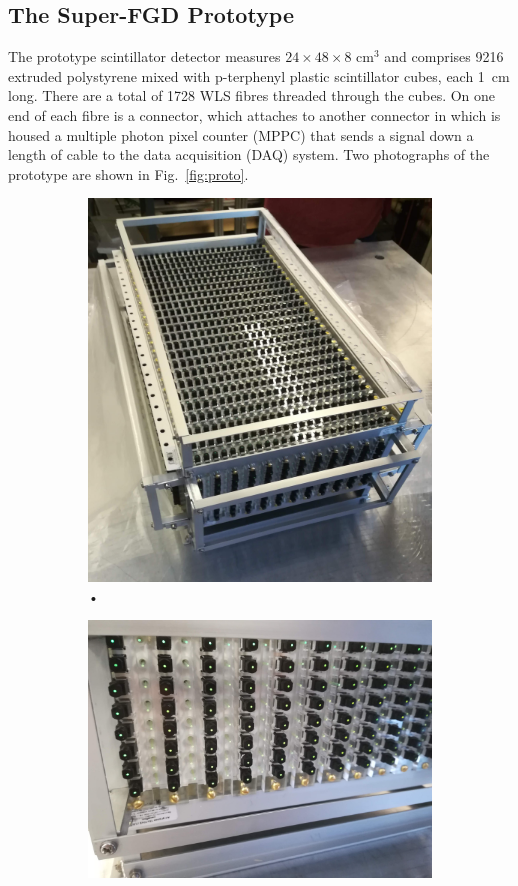 \documentclass[aps,pra,12pt,notitlepage,tightenlines]{revtex4-1}
\begin{document}
\subsection{The Super-FGD Prototype}
The prototype scintillator detector measures $24\times48\times8$ cm$^3$ and comprises 9216 extruded polystyrene mixed with p-terphenyl plastic scintillator cubes, each 1~cm long. There are a total of 1728 WLS fibres threaded through the cubes. On one end of each fibre is a connector, which attaches to another connector in which is housed a multiple photon pixel counter (MPPC) that sends a signal down a length of cable to the data acquisition (DAQ) system. Two photographs of the prototype are shown in Fig.\ \ref{fig:proto}.
 \begin{figure}
  \centering
  \begin{subfigure}{.5\textwidth}
   \centering
   \includegraphics[width=.7\linewidth]{proto}
   \caption{•}
   \label{fig:protoa}
  \end{subfigure}%
  \begin{subfigure}{.5\textwidth}
   \centering
   \includegraphics[width=.8\linewidth]{side}

\end{subfigure}
\end{figure}
\end{document}
